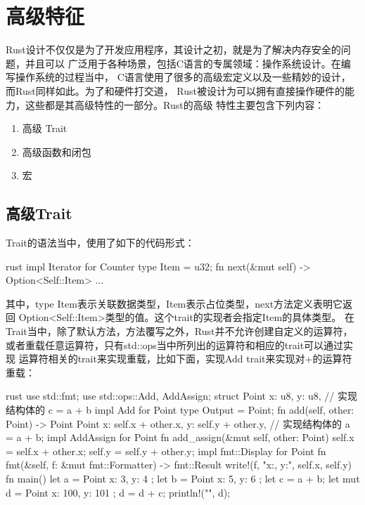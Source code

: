\section{高级特征}
Rust设计不仅仅是为了开发应用程序，其设计之初，就是为了解决内存安全的问题，并且可以
广泛用于各种场景，包括C语言的专属领域：操作系统设计。在编写操作系统的过程当中，
C语言使用了很多的高级宏定义以及一些精妙的设计，而Rust同样如此。为了和硬件打交道，
Rust被设计为可以拥有直接操作硬件的能力，这些都是其高级特性的一部分。Rust的高级
特性主要包含下列内容：
\begin{enumerate}
  \item 高级 Trait
  \item 高级函数和闭包
  \item 宏
\end{enumerate}

\subsection{高级Trait}
Trait的语法当中，使用了如下的代码形式：
\begin{code-block}{rust}
impl Iterator for Counter {
    type Item = u32;
    fn next(&mut self) -> Option<Self::Item> {
        ...
    }
}
\end{code-block}
其中，type Item表示关联数据类型，Item表示占位类型，next方法定义表明它返回
Option<Self::Item>类型的值。这个trait的实现者会指定Item的具体类型。
在Trait当中，除了默认方法，方法覆写之外，Rust并不允许创建自定义的运算符，
或者重载任意运算符，只有std::ops当中所列出的运算符和相应的trait可以通过实现
运算符相关的trait来实现重载，比如下面，实现Add trait来实现对+的运算符重载：
\begin{code-block}{rust}
use std::fmt;
use std::ops::{Add, AddAssign};
struct Point {
    x: u8,
    y: u8,
}
// 实现结构体的 c = a + b
impl Add for Point {
    type Output = Point;
    fn add(self, other: Point) -> Point {
        Point {
            x: self.x + other.x,
            y: self.y + other.y,
        }
    }
}
// 实现结构体的 a = a + b;
impl AddAssign for Point {
    fn add_assign(&mut self, other: Point) {
        self.x = self.x + other.x;
        self.y = self.y + other.y;
    }
}
impl fmt::Display for Point {
    fn fmt(&self, f: &mut fmt::Formatter) -> fmt::Result {
        write!(f, "x:{}, y:{}", self.x, self.y)
    }
}
fn main() {
    let a = Point { x: 3, y: 4 };
    let b = Point { x: 5, y: 6 };
    let c = a + b;
    let mut d = Point { x: 100, y: 101 };
    d = d + c;
    println!("{}", d);
}
\end{code-block}

